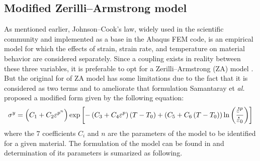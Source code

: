 \documentclass[twoside,english,1p,final,sort&compress]{elsarticle}
\makeatletter
\theoremstyle{plain}
\newcommand{\mdot}[1]{\accentset{\mbox{\bfseries .}}{#1}}
\newcommand*{\eal}{et \emph{al.}\@\xspace}
\makeatother
\begin{document}
\subsection{Modified Zerilli--Armstrong model\label{sec:MZA}}

As mentioned earlier, Johnson--Cook's law, widely used in the scientific community and implemented as a base in the Abaqus FEM code, is an empirical model for which the effects of strain, strain rate, and temperature on material behavior are considered separately. Since a coupling exists in reality between these three variables, it is preferable to opt for a Zerilli--Armstrong (ZA) model \cite{Hull-2011}. But the original for of ZA model has some limitations due to the fact that it is considered as two terms and to ameliorate that formulation Samantaray \eal \cite{Samantaray-2009} proposed a modified form given by the following equation:
\begin{equation}
\label{eq:MZA-model}
\sigma^y = \left(C_{1}+C_{2}\varepsilon^{p^n}\right) \exp\left[-\left(C_{3}+C_{4}\varepsilon^p\right)\left(T-T_0\right) + \left(C_{5}+C_{6}\left(T-T_0\right)\right)\ln\left( \frac{\mdot{\varepsilon}^p}{\mdot{\varepsilon}_0}\right)\right]
\end{equation}
where the $7$ coefficients $C_i$ and $n$ are the parameters of the model to be identified for a given material. The formulation of the model can be found in \cite{Samantaray-2009} and determination of its parameters is sumarized as following.
\end{document}
